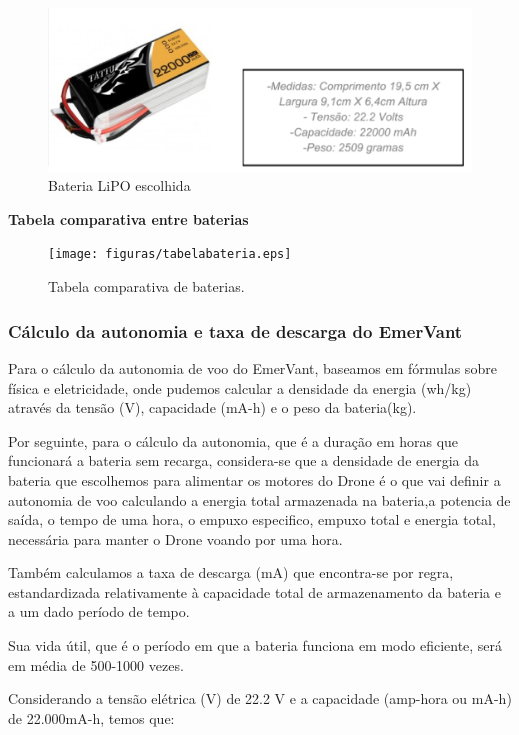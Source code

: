 \begin{figure}[H]
    \centering
	\includegraphics[keepaspectratio=true,scale=0.6]{figuras/baterialipo.eps}
    \caption{Bateria LiPO escolhida}
    \label{fig:baterialipo}
\end{figure}

\textbf{Tabela comparativa entre baterias}

\begin{figure}[H]
    \centering
	\texttt{[image: figuras/tabelabateria.eps]}
    \caption{Tabela comparativa de baterias.}
    \label{fig:tabelabateria}
\end{figure}


\subsubsection{Cálculo da autonomia e taxa de descarga do EmerVant}

Para o cálculo da autonomia de voo do EmerVant, baseamos em fórmulas sobre física e eletricidade, onde pudemos calcular a densidade da energia (wh/kg) através da tensão (V), capacidade (mA-h) e o peso da bateria(kg). 

Por seguinte, para o cálculo da autonomia, que é a duração em horas que funcionará a bateria sem recarga, considera-se que a densidade de energia da bateria que escolhemos para alimentar os motores do Drone é o que vai definir a autonomia de voo calculando a energia total armazenada na bateria,a potencia de saída, o tempo de uma hora, o empuxo especifico, empuxo total e energia total, necessária para manter o Drone voando por uma hora. 

Também calculamos a taxa de descarga (mA) que encontra-se por regra, estandardizada relativamente à capacidade total de armazenamento da bateria e a um dado período de tempo.

Sua vida útil, que é o período em que a bateria funciona em modo eficiente, será em média de 500-1000 vezes.

Considerando a tensão elétrica (V) de  22.2 V e a capacidade (amp-hora ou mA-h) de 22.000mA-h, temos que: 

